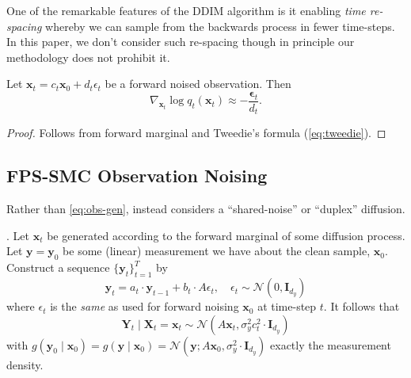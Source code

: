 \begin{remark} \label{rem:time-respacing}
    One of the remarkable features of the DDIM algorithm is it enabling \emph{time re-spacing}
    whereby we can sample from the backwards process in fewer time-steps. In this paper, we don't
    consider such re-spacing though in principle our methodology does not prohibit it.
\end{remark}

\begin{proposition} \label{prop:score-to-noise}
    Let $\mathbf{x}_t = c_t\mathbf{x}_0 + d_t\epsilon_t$ be a forward noised observation. Then
    $$
    \nabla_{\mathbf{x}_t} \log q_t(\mathbf{x}_t) \approx -\frac{\mathbf{\epsilon}_t}{d_t}.
    $$
\end{proposition}
\begin{proof}
    Follows from forward marginal and Tweedie's formula (\autoref{eq:tweedie}).
\end{proof}

\subsection{FPS-SMC Observation Noising}

Rather than \autoref{eq:obs-gen}, \textcite{douDiffusionPosteriorSampling2023} instead considers
a ``shared-noise'' or ``duplex'' diffusion.

\begin{proposition} \label{prop:obs-diffusion}
    \textcite[Proposition B.1]{douDiffusionPosteriorSampling2023}.
    Let $\mathbf{x}_t$ be generated according to the forward marginal of some diffusion process.
    Let $\mathbf{y} = \mathbf{y}_0$ be some (linear) measurement we have about the clean sample,
    $\mathbf{x}_0$. Construct a sequence $\{\mathbf{y}_t\}_{t=1}^T$ by
    \begin{equation*}
        \mathbf{y}_t = a_t\cdot \mathbf{y}_{t-1} + b_t\cdot A\epsilon_t,\quad \epsilon_t \sim \mathcal{N}(0, \mathbf{I}_{d_y})
    \end{equation*}
    where $\epsilon_t$ is the \emph{same} as used for forward noising $\mathbf{x}_0$ at time-step $t$.
    It follows that
    \begin{equation}
        \mathbf{Y}_t \mid \mathbf{X}_t = \mathbf{x}_t \sim \mathcal{N}(A\mathbf{x}_t, \sigma_y^2c_t^2\cdot \mathbf{I}_{d_y}) \label{eq:obs-likelihood-dou}
    \end{equation}
    with $g(\mathbf{y}_0 \mid \mathbf{x}_0) = g(\mathbf{y} \mid \mathbf{x}_0) = \mathcal{N}(\mathbf{y}; A\mathbf{x}_0, \sigma_y^2\cdot \mathbf{I}_{d_y})$
    exactly the measurement density.
\end{proposition}

